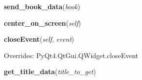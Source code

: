     \label{ClientClass:Client:send_book_data}

    \vspace{0.5ex}

\hspace{.8\funcindent}\begin{boxedminipage}{\funcwidth}

    \raggedright \textbf{send\_book\_data}(\textit{book})

\setlength{\parskip}{2ex}
\setlength{\parskip}{1ex}
    \end{boxedminipage}

    \label{ClientClass:Client:center_on_screen}

    \vspace{0.5ex}

\hspace{.8\funcindent}\begin{boxedminipage}{\funcwidth}

    \raggedright \textbf{center\_on\_screen}(\textit{self})

\setlength{\parskip}{2ex}
\setlength{\parskip}{1ex}
    \end{boxedminipage}

    \vspace{0.5ex}

\hspace{.8\funcindent}\begin{boxedminipage}{\funcwidth}

    \raggedright \textbf{closeEvent}(\textit{self}, \textit{event})

\setlength{\parskip}{2ex}
\setlength{\parskip}{1ex}
      Overrides: PyQt4.QtGui.QWidget.closeEvent

    \end{boxedminipage}

    \label{ClientClass:Client:get_title_data}

    \vspace{0.5ex}

\hspace{.8\funcindent}\begin{boxedminipage}{\funcwidth}

    \raggedright \textbf{get\_title\_data}(\textit{title\_to\_get})

\setlength{\parskip}{2ex}
\setlength{\parskip}{1ex}
    \end{boxedminipage}


